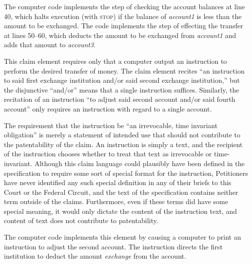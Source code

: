 \documentclass{scotus}
\begin{document}
The computer code implements the step of checking the account balances at line
40, which halts execution (with \textsc{stop}) if the balance of
\emph{account1} is less than the amount to be exchanged. The code implements the
step of effecting the transfer at lines 50--60, which deducts the amount to be
exchanged from \emph{account1} and adds that amount to \emph{account3}.


This claim element requires only that a computer output an instruction to
perform the desired transfer of money. The claim element recites ``an
instruction to said first exchange institution and/or said second exchange
institution,'' but the disjunctive ``and/or'' means that a single instruction
suffices. Similarly, the recitation of an instruction ``to adjust said second
account and/or said fourth account'' only requires an instruction with regard to
a single account.

The requirement that the instruction be ``an irrevocable, time invariant
obligation'' is merely a statement of intended use that should not contribute to
the patentability of the claim. An instruction is simply a text, and the
recipient of the instruction chooses whether to treat that text as irrevocable
or time-invariant. Although this claim language could plausibly have been
defined in the specification to require some sort of special format for the
instruction, Petitioners have never identified any such special definition in
any of their briefs to this Court or the Federal Circuit, and the text of the
specification contains neither term outside of the claims. Furthermore, even if
these terms did have some special meaning, it would only dictate the content of
the instruction text, and content of text does not contribute to patentability.

The computer code implements this element by causing a computer to print an
instruction to adjust the second account. The instruction directs the
first institution to deduct the amount \emph{exchange} from the account.


\wholeclaim
\end{document}
